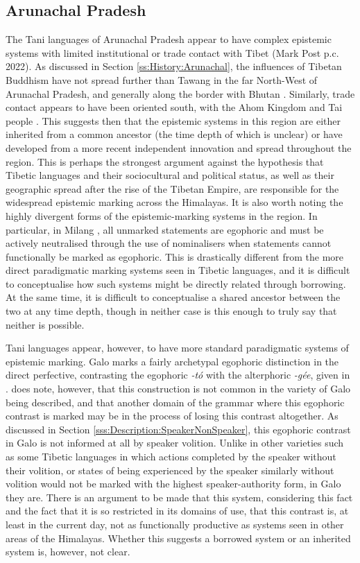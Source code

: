 \subsection{Arunachal Pradesh}
The Tani languages of Arunachal Pradesh appear to have complex epistemic systems with limited institutional or trade contact with Tibet (Mark Post p.c. 2022). As discussed in Section \ref{ss:History:Arunachal}, the influences of Tibetan Buddhism have not spread further than Tawang in the far North-West of Arunachal Pradesh, and generally along the border with Bhutan \cite{Namgyal2020}. Similarly, trade contact appears to have been oriented south, with the Ahom Kingdom and Tai people \cite{Nyori1993}. This suggests then that the epistemic systems in this region are either inherited from a common ancestor (the time depth of which is unclear) or have developed from a more recent independent innovation and spread throughout the region. This is perhaps the strongest argument against the hypothesis that Tibetic languages and their sociocultural and political status, as well as their geographic spread after the rise of the Tibetan Empire, are responsible for the widespread epistemic marking across the Himalayas. It is also worth noting the highly divergent forms of the epistemic-marking systems in the region. In particular, in Milang \cite[Siangic,][]{Modi2017}, all unmarked statements are egophoric and must be actively neutralised through the use of nominalisers when statements cannot functionally be marked as egophoric. This is drastically different from the more direct paradigmatic marking systems seen in Tibetic languages, and it is difficult to conceptualise how such systems might be directly related through borrowing. At the same time, it is difficult to conceptualise a shared ancestor between the two at any time depth, though in neither case is this enough to truly say that neither is possible.

Tani languages appear, however, to have more standard paradigmatic systems of epistemic marking. Galo marks a fairly archetypal egophoric distinction in the direct perfective, contrasting the egophoric \textit{-tó} with the alterphoric \textit{-gée}, given in .  does note, however, that this construction is not common in the variety of Galo being described, and that another domain of the grammar where this egophoric contrast is marked may be in the process of losing this contrast altogether. As discussed in Section \ref{sss:Description:SpeakerNonSpeaker}, this egophoric contrast in Galo is not informed at all by speaker volition. Unlike in other varieties such as some Tibetic languages in which actions completed by the speaker without their volition, or states of being experienced by the speaker similarly without volition would not be marked with the highest speaker-authority form, in Galo they are. There is an argument to be made that this system, considering this fact and the fact that it is so restricted in its domains of use, that this contrast is, at least in the current day, not as functionally productive as systems seen in other areas of the Himalayas. Whether this suggests a borrowed system or an inherited system is, however, not clear.

